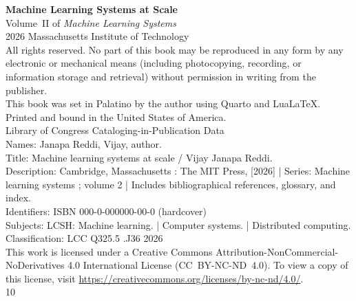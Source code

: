 \null\vfill
\begin{flushleft}
\thispagestyle{empty}

{\large\bfseries Machine Learning Systems at Scale}\\[0.5em]
{\normalsize Volume~II of \textit{Machine Learning Systems}}\\[1.5em]

\textcopyright{} 2026 Massachusetts Institute of Technology\\[0.5em]

All rights reserved. No part of this book may be reproduced in any form by any electronic or mechanical means (including photocopying, recording, or information storage and retrieval) without permission in writing from the publisher.\\[1em]

This book was set in Palatino by the author using Quarto and Lua\LaTeX.\\[0.5em]

Printed and bound in the United States of America.\\[1em]

Library of Congress Cataloging-in-Publication Data\\[0.25em]
Names: Janapa Reddi, Vijay, author.\\
Title: Machine learning systems at scale / Vijay Janapa Reddi.\\
Description: Cambridge, Massachusetts : The MIT Press, [2026] | Series: Machine learning systems ; volume 2 | Includes bibliographical references, glossary, and index.\\
Identifiers: ISBN 000-0-000000-00-0 (hardcover)\\
Subjects: LCSH: Machine learning. | Computer systems. | Distributed computing.\\
Classification: LCC Q325.5 .J36 2026\\[1em]

This work is licensed under a Creative Commons Attribution-NonCommercial-NoDerivatives 4.0 International License (CC~BY-NC-ND~4.0). To view a copy of this license, visit \url{https://creativecommons.org/licenses/by-nc-nd/4.0/}.\\[1em]

10

\end{flushleft}
